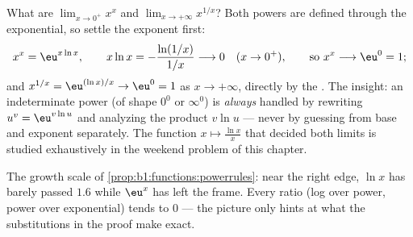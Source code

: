 \begin{example}\label{ex:b1:functions:xx}
What are $\lim_{x \to 0^+} x^x$ and $\lim_{x \to +\infty}
x^{1/x}$? Both powers are defined through the exponential, so
settle the exponent first:
\[
x^x = \eu^{x\ln x}, \qquad
x\ln x = -\frac{\ln(1/x)}{1/x} \longrightarrow 0
\quad (x \to 0^+),
\qquad\text{so } x^x \longrightarrow \eu^0 = 1 ;
\]
and $x^{1/x} = \eu^{(\ln x)/x} \to \eu^0 = 1$ as $x \to +\infty$,
directly by the . The insight: an indeterminate
power (of shape $0^0$ or $\infty^0$) is \emph{always} handled by
rewriting $u^v = \eu^{v\ln u}$ and analyzing the product $v \ln u$
--- never by guessing from base and exponent separately. The
function $x \mapsto \frac{\ln x}{x}$ that decided both limits is
studied exhaustively in the weekend problem of this chapter.
\end{example}

\begin{omfigure}

{\small The growth scale of
\cref{prop:b1:functions:powerrules}: near the right edge, $\ln x$
has barely passed $1.6$ while $\eu^x$ has left the frame. Every
ratio (log over power, power over exponential) tends to $0$ ---
the picture only hints at what the substitutions in the proof make
exact.}
\end{omfigure}


